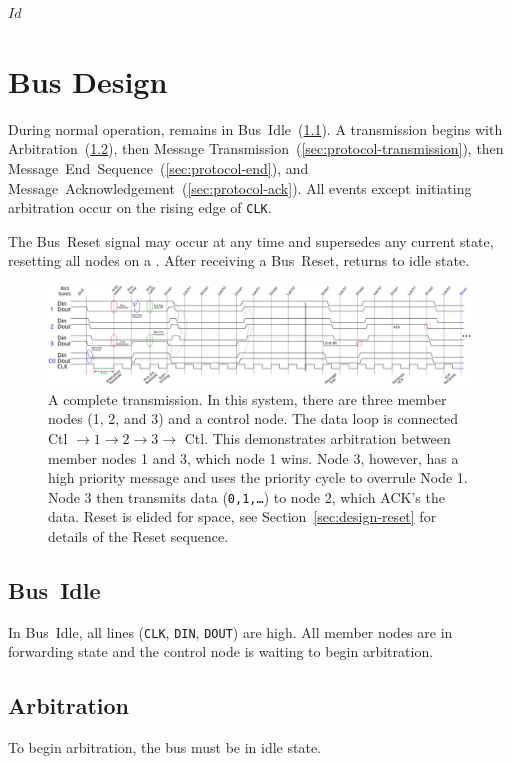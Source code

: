 \svnInfo $Id$

\section{Bus Design}
\label{sec:protocol}
During normal operation, \bus remains in Bus~Idle~(\ref{sec:protocol-idle}).
A transmission begins with Arbitration~(\ref{sec:protocol-arbitration}), then
Message Transmission~(\ref{sec:protocol-transmission}), then
Message~End~Sequence~(\ref{sec:protocol-end}),
and Message~Acknowledgement~(\ref{sec:protocol-ack}).
All events except initiating arbitration occur on the rising
edge of {\tt CLK}.

The Bus~Reset signal may occur at any time and supersedes any current state,
resetting all nodes on a \bus. After receiving a Bus~Reset, \bus returns to
{\sc idle} state.

\begin{figure}[h!]
\includegraphics[width=\linewidth]{img/timing}
\caption{A complete transmission. In this system, there are
three member nodes (1, 2, and 3) and a control node. The data loop is connected
Ctl $\rightarrow 1 \rightarrow 2 \rightarrow 3 \rightarrow$ Ctl. This
demonstrates arbitration between member nodes 1 and 3, which node 1 wins. Node
3, however, has a high priority message and uses the priority cycle to
overrule Node 1. Node 3 then transmits data ({\tt 0,1,\ldots}) to node 2,
which ACK's the data.  Reset is elided for space, see
Section~\ref{sec:design-reset} for details of the Reset sequence.
}
\label{fig:transmission}
\end{figure}

\subsection{Bus~Idle}
\label{sec:protocol-idle}
In \bus Bus~Idle, all lines ({\tt CLK}, {\tt DIN}, {\tt DOUT}) are high.
All member nodes are in forwarding state and the control node is waiting to
begin arbitration.

\subsection{Arbitration}
\label{sec:protocol-arbitration}
To begin arbitration, the bus must be in idle state.

